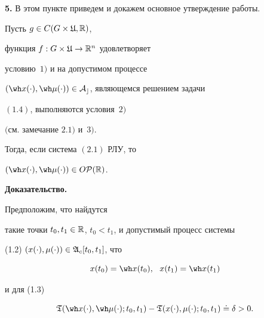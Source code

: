 \addtocounter{section}{1}


\setcounter{equation}{0}


\setcounter{thms}{0}


\setcounter{lems}{0}


\setcounter{cors}{0}


\setcounter{notes}{0}


\setcounter{defns}{0}


\setcounter{footnote}{0}





{\bf 5.} В этом пункте приведем и докажем основное утверждение работы.





\begin{thms}


Пусть $g\in C(G\times \frak U,\Bbb R)$,


функция $f:G\times \frak U\to\Bbb R^n$ удовлетворяет


условию~$1)$ и на допустимом процессе


$(\wh x(\cdot),\wh\mu(\cdot))\in\cal A_c$, являющемся решением задачи


$(1.4)$, выполняются условия~$2)$


$($см. замечание $2.1)$ и~$3)$.


Тогда, если система $(2.1)$ РЛУ, то


$(\wh x(\cdot),\wh\mu(\cdot))\in O\cal P(\bR)$.


\end{thms}





{\bf Доказательство.}


Предположим, что найдутся


такие точки $t_0,t_1\in\Bbb R$, $t_0<t_1$, и допустимый процесс системы


(1.2) $(x(\cdot),\mu(\cdot))\in\frak A_c[t_0,t_1]$, что


\begin{equation}


x(t_0)=\wh x(t_0),\ \ x(t_1)=\wh x(t_1)


\end{equation}


и для (1.3)


\begin{equation}


\frak T(\wh x(\cdot),\wh\mu(\cdot);t_0, t_1) -


\frak T(x(\cdot),\mu(\cdot);t_0,t_1)\doteq\delta>0.


\end{equation}





